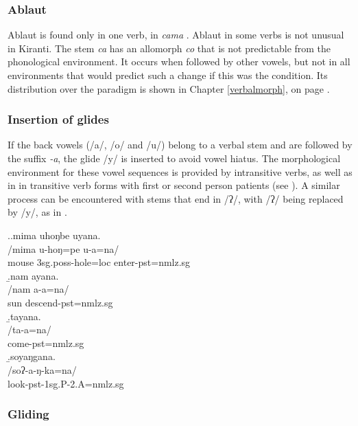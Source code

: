 \subsubsection{Ablaut} 

Ablaut is found only in one verb, in \emph{cama} . Ablaut in some verbs is not unusual in Kiranti. The stem \emph{ca} has an allomorph \emph{co} that is not predictable from the phonological environment. It occurs when followed by other vowels, but not in all environments that would predict such a change if this was the condition.  Its distribution over the paradigm is shown in Chapter \ref{verbalmorph}, on page \pageref{par-cama-pst}.



\subsubsection{Insertion of glides}

If the back vowels (/a/, /o/ and /u/) belong to a verbal stem and are followed by the suffix \emph{-a}, the glide /y/ is inserted to avoid vowel hiatus. The morphological environment for these vowel sequences is provided by intransitive verbs, as well as in  in transitive verb forms with first or second person patients (see \Next). A similar process can  be encountered with stems that end in /ʔ/, with /ʔ/ being replaced by /y/, as in  \Next[d].

\ex.\a.\glll mima uhoŋbe uyana.\\
/mima u-hoŋ=pe u-a=na/\\
mouse {\sc 3sg.poss-}hole{\sc =loc}  enter{\sc [3sg]-pst=nmlz.sg}\\
\b.\glll  nam ayana.\\
/nam a-a=na/\\
sun descend{\sc [3sg]-pst=nmlz.sg}\\
\b.\glll  tayana.\\
/ta-a=na/\\
come{\sc [3sg]-pst=nmlz.sg}\\
\b.\glll  soyaŋgana.\\
/soʔ-a-ŋ-ka=na/\\
look{\sc -pst-1sg.P-2.A=nmlz.sg}\\


\subsubsection{Gliding}

